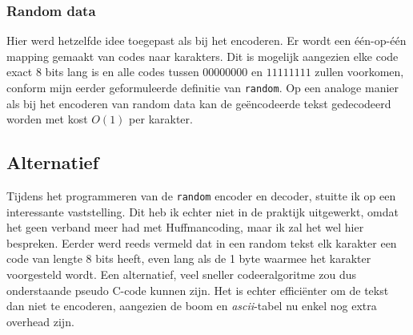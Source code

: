 \subsubsection{Random data}
Hier werd hetzelfde idee toegepast als bij het encoderen. Er wordt een één-op-één mapping gemaakt van codes naar karakters. Dit is mogelijk aangezien elke code exact 8 bits lang is en alle codes tussen $00000000$ en $11111111$ zullen voorkomen, conform mijn eerder geformuleerde definitie van \texttt{random}. Op een analoge manier als bij het encoderen van random data kan de ge\"encodeerde tekst gedecodeerd worden met kost $O(1)$ per karakter.

\subsection{Alternatief}
\label{impl:std:alt}
Tijdens het programmeren van de \texttt{random} encoder en decoder, stuitte ik op een interessante vaststelling. Dit heb ik echter niet in de praktijk uitgewerkt, omdat het geen verband meer had met Huffmancoding, maar ik zal het wel hier bespreken. Eerder werd reeds vermeld dat in een random tekst elk karakter een code van lengte 8 bits heeft, even lang als de 1 byte waarmee het karakter voorgesteld wordt. Een alternatief, veel sneller codeeralgoritme zou dus onderstaande pseudo C-code kunnen zijn. Het is echter effici\"enter om de tekst dan niet te encoderen, aangezien de boom en \emph{ascii}-tabel nu enkel nog extra overhead zijn.